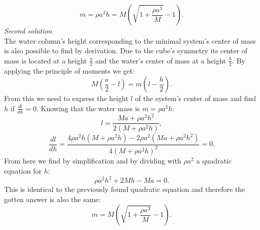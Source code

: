 {$$m=\rho a^2h=M(\sqrt{1+\frac{\rho a^3}{M}}-1).$$
\emph{Second solution}\\
The water column’s height corresponding to the minimal system’s center of mass is also possible to find by derivation. Due to the cube’s symmetry its center of mass is located at a height $\frac{a}{2}$ and the water’s center of mass at a height $\frac{h}{2}$. By applying the principle of moments we get:
$$M(\frac{a}{2}-l)=m(l-\frac{h}{2}).$$
From this we need to express the height $l$ of the system’s center of mass and find $h$ if $\frac{dl}{dh}=0$. Knowing that the water mass is $m=\rho a^2h$:
$$l=\frac{Ma+\rho a^2h^2}{2(M+\rho a^2h)},$$
$$\frac{dl}{dh}=\frac{4\rho a^2h(M+\rho a^2h)-2\rho a^2(Ma+\rho a^2h^2)}{4(M+\rho a^2h)^2}=0.$$
From here we find by simplification and by dividing with $\rho a^2$ a quadratic equation for $h$:
$$\rho a^2h^2+2Mh-Ma=0.$$
This is identical to the previously found quadratic equation and therefore the gotten answer is also the same:
$$m=M(\sqrt{1+\frac{\rho a^3}{M}}-1).$$
\fi
}